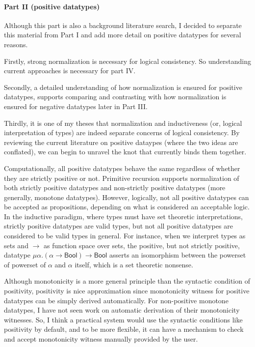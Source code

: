 \paragraph{Part II (positive datatypes)}
Although this part is also a background literature search, I decided to
separate this material from Part I and add more detail on positive datatypes
for several reasons.

Firstly, strong normalization is necessary for logical consistency.
So understanding current approaches is necessary for part IV.

Secondly, a detailed understanding of how normalization is ensured for
positive datatypes, supports comparing and contrasting with how normalization
is ensured for negative datatypes later in Part III.

Thirdly, it is one of my theses that normalization and inductiveness
(or, logical interpretation of types) are indeed separate concerns
of logical consistency. By reviewing the current literature
on positive dataypes (where the two ideas are conflated), we can 
begin to unravel the knot that currently binds them together.

Computationally, all positive datatypes behave the same
regardless of whether they are strictly positive or not.
Primitive recursion supports normalization of both strictly positive datatypes
and non-strictly positive datatypes (more generally, monotone datatypes).
However, logically, not all positive datatypes can be accepted as propositions,
depending on what is considered an acceptable logic. In the inductive paradigm,
where types must have set theoretic interpretations, strictly positive datatypes
are valid types, but not all positive datatypes are considered to be valid types
in general. For instance, when we interpret types as sets and $\to$ as
function space over sets, the positive, but not strictly positive, datatype
$\mu \alpha.(\alpha\to\textsf{Bool})\to\textsf{Bool}$ asserts an isomorphism
between the powerset of powerset of $\alpha$ and $\alpha$ itself, which is
a set theoretic nonsense.

Although monotonicity is a more general principle than the syntactic condition
of positivity, positivity is nice approximation since monotonicity witness for
positive datatypes can be simply derived automatically. For non-positive
monotone datatypes, I have not seen work on automatic derivation of their
monotonicity witnesses. So, I think a practical system would use the syntactic
conditions like positivity by default, and to be more flexible, it can have
a mechanism to check and accept monotonicity witness manually provided by
the user.

